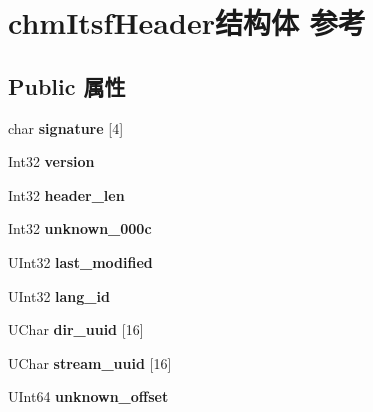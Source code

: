 \hypertarget{structchm_itsf_header}{}\section{chm\+Itsf\+Header结构体 参考}
\label{structchm_itsf_header}
\subsection*{Public 属性}
\begin{DoxyCompactItemize}
\item 
\mbox{\label{structchm_itsf_header_ad29bf48d220fa3c33e28efe4a1c8cf2d}} 
char {\bfseries signature} \mbox{[}4\mbox{]}
\item 
\mbox{\label{structchm_itsf_header_a09788e0af47dd0fe94fa4b415a7a81f1}} 
Int32 {\bfseries version}
\item 
\mbox{\label{structchm_itsf_header_a4e0e6fdc49711ebeb63d161219366e00}} 
Int32 {\bfseries header\+\_\+len}
\item 
\mbox{\label{structchm_itsf_header_a0d84c448c303651cf6a3c82bd84f9e5d}} 
Int32 {\bfseries unknown\+\_\+000c}
\item 
\mbox{\label{structchm_itsf_header_a407f34e02e4621fed554300c6fdd5c12}} 
U\+Int32 {\bfseries last\+\_\+modified}
\item 
\mbox{\label{structchm_itsf_header_a89f210318186fcc5baf8ebad56201cbb}} 
U\+Int32 {\bfseries lang\+\_\+id}
\item 
\mbox{\label{structchm_itsf_header_add1ce3e416a4c130940f5db6543a9e26}} 
U\+Char {\bfseries dir\+\_\+uuid} \mbox{[}16\mbox{]}
\item 
\mbox{\label{structchm_itsf_header_a0b2c7728094ae543c0f2067da8a06da5}} 
U\+Char {\bfseries stream\+\_\+uuid} \mbox{[}16\mbox{]}
\item 
\mbox{\label{structchm_itsf_header_afea4b8b96adf507a4dd577e0062dc8e3}} 
U\+Int64 {\bfseries unknown\+\_\+offset}

\end{DoxyCompactItemize}

